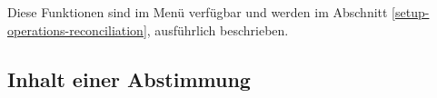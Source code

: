 Diese Funktionen sind im Menü  verfügbar und werden im Abschnitt \vref{setup-operations-reconciliation},  ausführlich beschrieben.


\subsection{Inhalt einer Abstimmung\label{reconciliation-manage-content}}

